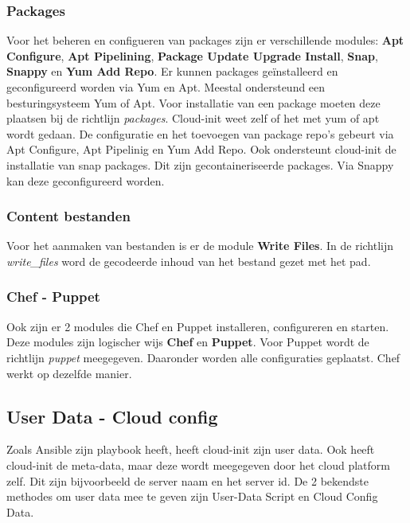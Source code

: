 \subsubsection{Packages}
Voor het beheren en configueren van packages zijn er verschillende modules: \textbf{Apt Configure}, \textbf{Apt Pipelining}, \textbf{Package Update Upgrade Install}, \textbf{Snap}, \textbf{Snappy} en \textbf{Yum Add Repo}. Er kunnen packages geïnstalleerd en geconfigureerd worden via Yum en Apt. Meestal ondersteund een besturingsysteem Yum of Apt. Voor installatie van een package moeten deze plaatsen bij de richtlijn \textit{packages}. Cloud-init weet zelf of het met yum of apt wordt gedaan. De configuratie en het toevoegen van package repo's gebeurt via Apt Configure, Apt Pipelinig en Yum Add Repo. Ook ondersteunt cloud-init de installatie van snap packages. Dit zijn gecontaineriseerde packages. Via Snappy kan deze geconfigureerd worden.

\subsubsection{Content bestanden}
Voor het aanmaken van bestanden is er de module \textbf{Write Files}. In de richtlijn \textit{write\_files} word de gecodeerde inhoud van het bestand gezet met het pad.

\subsubsection{Chef - Puppet}
Ook zijn er 2 modules die Chef en Puppet installeren, configureren en starten. Deze modules zijn logischer wijs \textbf{Chef} en \textbf{Puppet}. Voor Puppet wordt de richtlijn \textit{puppet} meegegeven. Daaronder worden alle configuraties geplaatst. Chef werkt op dezelfde manier.

\subsection{User Data - Cloud config}
Zoals Ansible zijn playbook heeft, heeft cloud-init zijn user data. Ook heeft cloud-init de meta-data, maar deze wordt meegegeven door het cloud platform zelf. Dit zijn bijvoorbeeld de server naam en het server id. De 2 bekendste methodes om user data mee te geven zijn User-Data Script en Cloud Config Data. 
